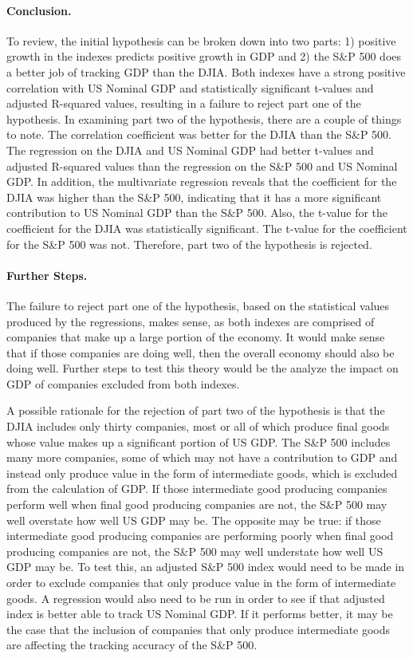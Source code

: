 \documentclass[11pt]{article}
\numberwithin{equation}{section}
\begin{document}
\paragraph{Conclusion.}
To review, the initial hypothesis can be broken down into two parts: 1) positive growth in the indexes predicts positive growth in GDP and 2) the S\&P 500 does a better job of tracking GDP than the DJIA. Both indexes have a strong positive correlation with US Nominal GDP and statistically significant t-values and adjusted R-squared values, resulting in a failure to reject part one of the hypothesis. In examining part two of the hypothesis, there are a couple of things to note. The correlation coefficient was better for the DJIA than the S\&P 500. The regression on the DJIA and US Nominal GDP had better t-values and adjusted R-squared values than the regression on the S\&P 500 and US Nominal GDP. In addition, the multivariate regression reveals that the coefficient for the DJIA was higher than the S\&P 500, indicating that it has a more significant contribution to US Nominal GDP than the S\&P 500. Also, the t-value for the coefficient for the DJIA was statistically significant. The t-value for the coefficient for the S\&P 500 was not. Therefore, part two of the hypothesis is rejected.

\paragraph{Further Steps.}
The failure to reject part one of the hypothesis, based on the statistical values produced by the regressions, makes sense, as both indexes are comprised of companies that make up a large portion of the economy. It would make sense that if those companies are doing well, then the overall economy should also be doing well. Further steps to test this theory would be the analyze the impact on GDP of companies excluded from both indexes.

A possible rationale for the rejection of part two of the hypothesis is that the DJIA includes only thirty companies, most or all of which produce final goods whose value makes up a significant portion of US GDP. The S\&P 500 includes many more companies, some of which may not have a contribution to GDP and instead only produce value in the form of intermediate goods, which is excluded from the calculation of GDP. If those intermediate good producing companies perform well when final good producing companies are not, the S\&P 500 may well overstate how well US GDP may be. The opposite may be true: if those intermediate good producing companies are performing poorly when final good producing companies are not, the S\&P 500 may well understate how well US GDP may be. To test this, an adjusted S\&P 500 index would need to be made in order to exclude companies that only produce value in the form of intermediate goods. A regression would also need to be run in order to see if that adjusted index is better able to track US Nominal GDP. If it performs better, it may be the case that the inclusion of companies that only produce intermediate goods are affecting the tracking accuracy of the S\&P 500.



\end{document}
